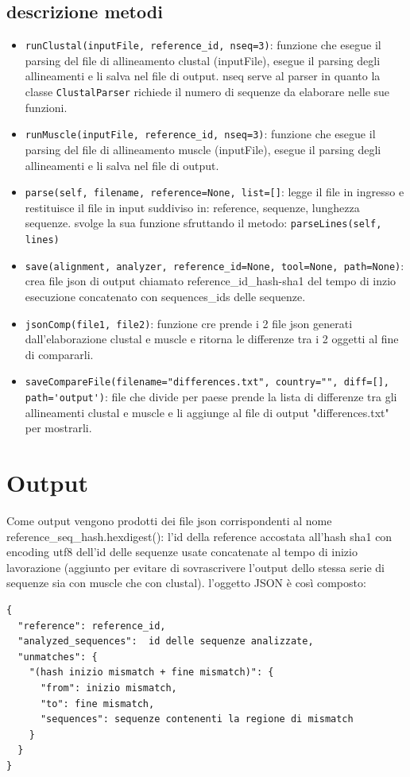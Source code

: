 \documentclass[11pt,italian]{article}
\begin{document}
\subsection{descrizione metodi}
\begin{itemize}
  \item \lstinline{runClustal(inputFile, reference_id, nseq=3)}: funzione che esegue il parsing del file di allineamento clustal (inputFile), esegue il parsing degli allineamenti e li salva nel file di output. \newline nseq serve al parser in quanto la classe \lstinline{ClustalParser} richiede il numero di sequenze da elaborare nelle sue funzioni.

  \item \lstinline{runMuscle(inputFile, reference_id, nseq=3)}: funzione che esegue il parsing del file di allineamento muscle (inputFile), esegue il parsing degli allineamenti e li salva nel file di output.

  \item \lstinline{parse(self, filename, reference=None, list=[]}:  legge il file in ingresso e restituisce il file in input suddiviso in: reference, sequenze, lunghezza sequenze. svolge la sua funzione sfruttando il metodo: \lstinline{parseLines(self, lines)}

  \item \lstinline{save(alignment, analyzer, reference_id=None, tool=None, path=None)}: crea file json di output chiamato reference\_id\_hash-sha1 del tempo di inzio esecuzione concatenato con sequences\_ids delle sequenze.

  \item \lstinline{jsonComp(file1, file2)}: funzione cre prende i 2 file json generati dall'elaborazione clustal e muscle e ritorna le differenze tra i 2 oggetti al fine di compararli.

  \item \lstinline{saveCompareFile(filename="differences.txt", country="", diff=[], path='output')}: file che divide per paese prende la lista di differenze tra gli allineamenti clustal e muscle e li aggiunge al file di output "differences.txt" per mostrarli.
\end{itemize}

\section{Output}
Come output vengono prodotti dei file json corrispondenti al nome reference\_seq\_hash.hexdigest(): l'id della reference accostata all'hash sha1 con encoding utf8 dell'id delle sequenze usate concatenate al tempo di inizio lavorazione (aggiunto per evitare di sovrascrivere l'output dello stessa serie di sequenze sia con muscle che con clustal).\newline
l'oggetto JSON è così composto:
\begin{lstlisting}
{
  "reference": reference_id,
  "analyzed_sequences":  id delle sequenze analizzate,
  "unmatches": {
    "(hash inizio mismatch + fine mismatch)": {
      "from": inizio mismatch,
      "to": fine mismatch,
      "sequences": sequenze contenenti la regione di mismatch
    }
  }
}
\end{lstlisting}
\end{document}
